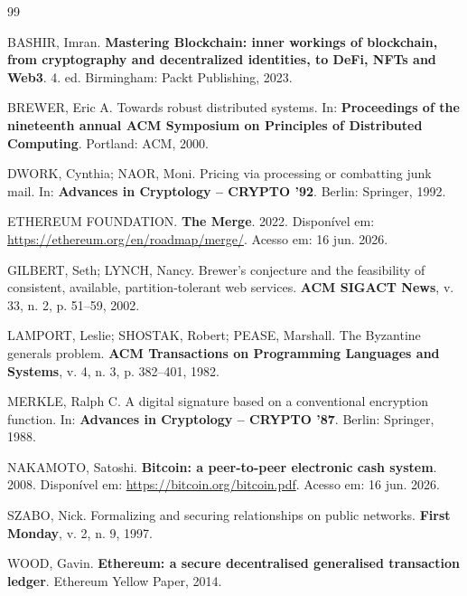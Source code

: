 \documentclass[12pt,a4paper]{report}
\begin{document}
\begin{thebibliography}{99}

BASHIR, Imran. \textbf{Mastering Blockchain: inner workings of blockchain, from cryptography and decentralized identities, to DeFi, NFTs and Web3}. 4. ed. Birmingham: Packt Publishing, 2023.

BREWER, Eric A. Towards robust distributed systems. In: \textbf{Proceedings of the nineteenth annual ACM Symposium on Principles of Distributed Computing}. Portland: ACM, 2000.

DWORK, Cynthia; NAOR, Moni. Pricing via processing or combatting junk mail. In: \textbf{Advances in Cryptology -- CRYPTO '92}. Berlin: Springer, 1992.

ETHEREUM FOUNDATION. \textbf{The Merge}. 2022. Disponível em: \url{https://ethereum.org/en/roadmap/merge/}. Acesso em: 16 jun. 2026.

GILBERT, Seth; LYNCH, Nancy. Brewer's conjecture and the feasibility of consistent, available, partition-tolerant web services. \textbf{ACM SIGACT News}, v. 33, n. 2, p. 51--59, 2002.

LAMPORT, Leslie; SHOSTAK, Robert; PEASE, Marshall. The Byzantine generals problem. \textbf{ACM Transactions on Programming Languages and Systems}, v. 4, n. 3, p. 382--401, 1982.

MERKLE, Ralph C. A digital signature based on a conventional encryption function. In: \textbf{Advances in Cryptology -- CRYPTO '87}. Berlin: Springer, 1988.

NAKAMOTO, Satoshi. \textbf{Bitcoin: a peer-to-peer electronic cash system}. 2008. Disponível em: \url{https://bitcoin.org/bitcoin.pdf}. Acesso em: 16 jun. 2026.

SZABO, Nick. Formalizing and securing relationships on public networks. \textbf{First Monday}, v. 2, n. 9, 1997.

WOOD, Gavin. \textbf{Ethereum: a secure decentralised generalised transaction ledger}. Ethereum Yellow Paper, 2014.

\end{thebibliography}
\end{document}
